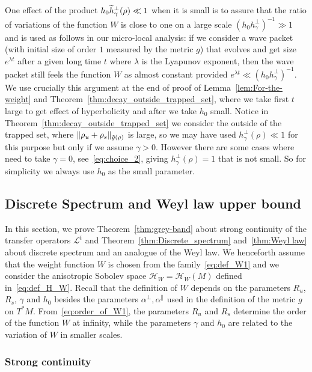 \documentclass[10pt]{amsart}
\theoremstyle{definition}\newtheorem{defi}[theo]{Definition}\newtheorem{rema}[theo]{Remark}\newtheorem{exam}[theo]{Example}\newtheorem{exem}[theo]{Example}\newtheorem{nota}[theo]{Notation}
\newcommand{\clH}{\mathcal{H}}
\newcommand{\clL}{\mathcal{L}}
\let\oldtilde\tilde
\renewcommand*{\tilde}[1]{\mathchoice{\widetilde{#1}}{\widetilde{#1}}{\oldtilde{#1}}{\oldtilde{#1}}}
\begin{document}
One effect of the product $h_{0}\tilde{h}_{\gamma}^{\perp}(\rho)\ll1$ when it is small is to assure that the ratio of variations of the function $W$ is close to one on a large scale $(h_{0}h_{\gamma}^{\perp})^{-1}\gg1$ and is used as follows in our micro-local analysis: if we consider a wave packet (with initial size of order $1$ measured by the metric $g$) that evolves and get size $e^{\lambda t}$ after a given long time $t$ where $\lambda$ is the Lyapunov exponent, then the wave packet still feels the function $W$ as almost constant provided $e^{\lambda t}\ll(h_{0}h_{\gamma}^{\perp})^{-1}$. We use crucially this argument at the end of proof of Lemma~\ref{lem:For-the-weight} and Theorem~\ref{thm:decay_outside_trapped_set}, where we take first $t$ large to get effect of hyperbolicity and after we take $h_{0}$ small. Notice in Theorem~\ref{thm:decay_outside_trapped_set} we consider the outside of the trapped set, where $\Vert \rho_{u}+\rho_{s}\Vert _{\tilde{g}(\rho)}$ is large, so we may have used $h_{\gamma}^{\perp}(\rho)\ll1$ for this purpose but only if we assume $\gamma>0$. However there are some cases where need to take $\gamma=0$, see~\eqref{eq:choice_2}, giving $h_{\gamma}^{\perp}(\rho)=1$ that is not small. So for simplicity we always use $h_{0}$ as the small parameter.

\subsection{\label{subsec:Discrete-Spectrum-and}
Discrete Spectrum and Weyl law upper bound}

In this section, we prove Theorem~\ref{thm:grey-band} about strong continuity of the transfer operators $\clL^{t}$ and Theorem~\ref{thm:Discrete_spectrum} and~\ref{thm:Weyl law} about discrete spectrum and an analogue of the Weyl law. We henceforth assume that the weight function $W$ is chosen from the family~\eqref{eq:def_W1} and we consider the anisotropic Sobolev space $\clH _{W}=\clH _{W}\left(M\right)$ defined in~\eqref{eq:def_H_W}. Recall that the definition of $W$ depends on the parameters $R_{u}$, $R_{s}$, $\gamma$ and $h_{0}$ besides the parameters $\alpha^{\perp},\alpha^{\parallel}$ used in the definition of the metric $g$ on $T^{*}M$. From~\eqref{eq:order_of_W1}, the parameters $R_{u}$ and $R_{s}$ determine the order of the function $W$ at infinity, while the parameters $\gamma$ and $h_{0}$ are related to the variation of $W$ in smaller scales.

\subsubsection{Strong continuity}
\end{document}

